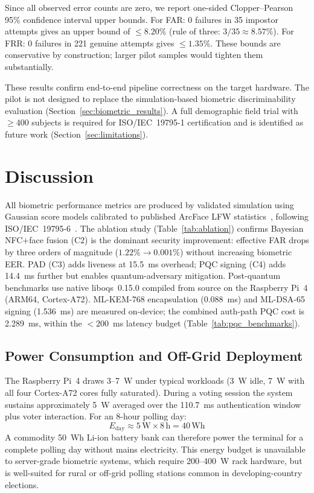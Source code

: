 \documentclass[pdflatex,sn-mathphys-num]{sn-jnl}%
\theoremstyle{thmstyleone}%
\theoremstyle{thmstyletwo}%
\theoremstyle{thmstylethree}%
\begin{document}
Since all observed error counts are zero, we report one-sided Clopper--Pearson
95\% confidence interval upper bounds. For FAR: 0 failures in 35 impostor
attempts gives an upper bound of \(\leq8.20\%\) (rule of three:
\(3/35\approx 8.57\%\)). For FRR: 0 failures in 221 genuine attempts gives
\(\leq1.35\%\). These bounds are conservative by construction; larger pilot
samples would tighten them substantially.

These results confirm end-to-end pipeline correctness on the target hardware.
The pilot is not designed to replace the simulation-based biometric
discriminability evaluation (Section~\ref{sec:biometric_results}). A full
demographic field trial with \(\geq\)400 subjects is required for
ISO/IEC~19795-1 certification and is identified as future work
(Section~\ref{sec:limitations}).

\section{Discussion}\label{sec:discussion}

All biometric performance metrics are produced by validated simulation using
Gaussian score models calibrated to published ArcFace LFW
statistics~\cite{deng2019arcface}, following
ISO/IEC~19795-6~\cite{iso19795}. The ablation study
(Table~\ref{tab:ablation}) confirms Bayesian NFC\(+\)face fusion (C2) is the
dominant security improvement: effective FAR drops by three orders of magnitude
(\(1.22\% \to 0.001\%\)) without increasing biometric EER. PAD (C3) adds
liveness at 15.5~ms overhead; PQC signing (C4) adds 14.4~ms further but
enables quantum-adversary mitigation. Post-quantum benchmarks use native
liboqs~0.15.0 compiled from source on the Raspberry Pi~4 (ARM64,
Cortex-A72). ML-KEM-768 encapsulation (0.088~ms) and ML-DSA-65 signing
(1.536~ms) are measured on-device; the combined auth-path PQC cost is
2.289~ms, within the \(<200\)~ms latency budget
(Table~\ref{tab:pqc_benchmarks}).

\subsection{Power Consumption and Off-Grid Deployment}\label{sec:power}

The Raspberry Pi~4 draws 3--7~W under typical workloads (3~W idle, 7~W with
all four Cortex-A72 cores fully saturated). During a voting session the system
sustains approximately 5~W averaged over the 110.7~ms authentication window
plus voter interaction. For an 8-hour polling day:
\begin{equation}
  E_{\mathrm{day}} \approx 5\,\mathrm{W} \times 8\,\mathrm{h} = 40\,\mathrm{Wh}
\end{equation}
A commodity 50~Wh Li-ion battery bank can therefore power the terminal for a
complete polling day without mains electricity. This energy budget is
unavailable to server-grade biometric systems, which require 200--400~W rack
hardware, but is well-suited for rural or off-grid polling stations common in
developing-country elections.
\end{document}
